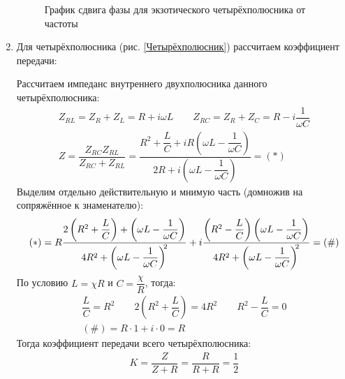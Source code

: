\documentclass[a4paper, usenames, dvipsnames]{article}
\begin{document}
\begin{enumerate}
\begin{figure}[h]
              \caption{График сдвига фазы для экзотического четырёхполюсника от частоты}
              \label{График сдвига фазы для экзотического четырёхполюсника от частоты}
          \end{figure}
    \item Для четырёхполюсника (рис. \ref{Четырёхполюсник}) рассчитаем коэффициент передачи:

          Рассчитаем импеданс внутреннего двухполюсника данного четырёхполюсника:
          \begin{gather*}
              Z_{RL} = Z_R + Z_L = R + i\omega L \hspace{2em} Z_{RC} = Z_R + Z_C = R - i\dfrac{1}{\omega C}\\
              Z = \dfrac{Z_{RC}Z_{RL}}{Z_{RC} + Z_{RL}} = \dfrac{R^2 + \dfrac{L}{C} + iR\left(\omega L - \dfrac{1}{\omega C}\right)}{2R + i\left(\omega L - \dfrac{1}{\omega C}\right)} = (*)
          \end{gather*}
          Выделим отдельно действительную и мнимую часть (домножив на сопряжённое к знаменателю):
          \begin{gather*}
              (*) = R \dfrac{2\left(R^2 + \dfrac{L}{C}\right) + \left(\omega L - \dfrac{1}{\omega C}\right)}{4R^2 + \left(\omega L - \dfrac{1}{\omega C}\right)^{\hspace{-0.25em}2}} + i\dfrac{\left(R^2 - \dfrac{L}{C}\right)\left(\omega L - \dfrac{1}{\omega C}\right)}{4R^2 + \left(\omega L - \dfrac{1}{\omega C}\right)^{\hspace{-0.25em}2}} = (\#)
          \end{gather*}
          По условию $L = \chi R$ и $C = \dfrac{\chi}{R}$, тогда:
          \begin{gather*}
              \dfrac{L}{C} = R^2 \hspace{2em} 2\left(R^2 + \dfrac{L}{C}\right) = 4R^2 \hspace{2em} R^2 - \dfrac{L}{C} = 0\\
              (\#) = R \cdot 1 + i \cdot 0 = R
          \end{gather*}
          Тогда коэффициент передачи всего четырёхполюсника:
          \begin{gather*}
              K = \dfrac{Z}{Z + R} = \dfrac{R}{R + R} = \dfrac{1}{2}
          \end{gather*}


\end{enumerate}
\end{document}

